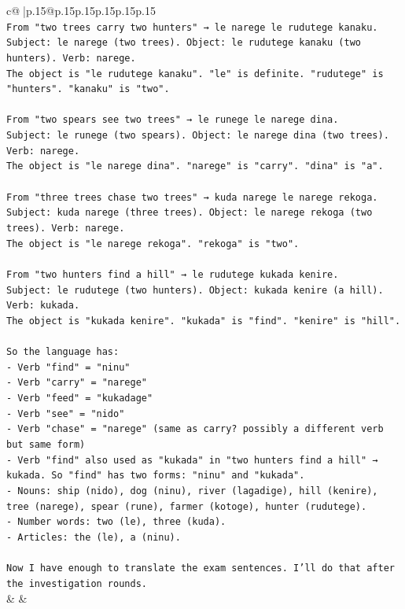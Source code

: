 \documentclass{article}
\begin{document}
{\begin{supertabular}{c@{$\;$}|p{.15\linewidth}@{}p{.15\linewidth}p{.15\linewidth}p{.15\linewidth}p{.15\linewidth}p{.15\linewidth}}
{{{\\ 
\texttt{From "two trees carry two hunters" → le narege le rudutege kanaku.} \\
\texttt{Subject: le narege (two trees). Object: le rudutege kanaku (two hunters). Verb: narege.} \\
\texttt{The object is "le rudutege kanaku". "le" is definite. "rudutege" is "hunters". "kanaku" is "two".} \\
\\ 
\texttt{From "two spears see two trees" → le runege le narege dina.} \\
\texttt{Subject: le runege (two spears). Object: le narege dina (two trees). Verb: narege.} \\
\texttt{The object is "le narege dina". "narege" is "carry". "dina" is "a".} \\
\\ 
\texttt{From "three trees chase two trees" → kuda narege le narege rekoga.} \\
\texttt{Subject: kuda narege (three trees). Object: le narege rekoga (two trees). Verb: narege.} \\
\texttt{The object is "le narege rekoga". "rekoga" is "two".} \\
\\ 
\texttt{From "two hunters find a hill" → le rudutege kukada kenire.} \\
\texttt{Subject: le rudutege (two hunters). Object: kukada kenire (a hill). Verb: kukada.} \\
\texttt{The object is "kukada kenire". "kukada" is "find". "kenire" is "hill".} \\
\\ 
\texttt{So the language has:} \\
\texttt{{-} Verb "find" = "ninu"} \\
\texttt{{-} Verb "carry" = "narege"} \\
\texttt{{-} Verb "feed" = "kukadage"} \\
\texttt{{-} Verb "see" = "nido"} \\
\texttt{{-} Verb "chase" = "narege" (same as carry? possibly a different verb but same form)} \\
\texttt{{-} Verb "find" also used as "kukada" in "two hunters find a hill" → kukada. So "find" has two forms: "ninu" and "kukada".} \\
\texttt{{-} Nouns: ship (nido), dog (ninu), river (lagadige), hill (kenire), tree (narege), spear (rune), farmer (kotoge), hunter (rudutege).} \\
\texttt{{-} Number words: two (le), three (kuda).} \\
\texttt{{-} Articles: the (le), a (ninu).} \\
\\ 
\texttt{Now I have enough to translate the exam sentences. I'll do that after the investigation rounds.} \\
            }
        }
    }
    & & \\ \\


\end{supertabular}}
\end{document}
